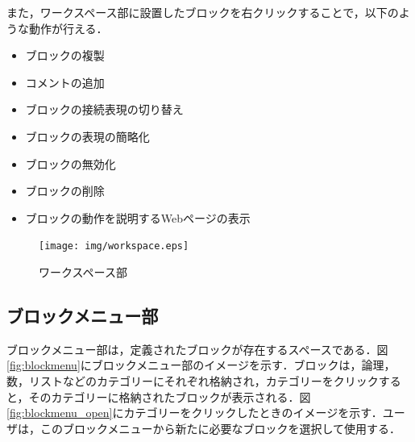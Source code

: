 \documentclass{risepaper}
\begin{document}
また，ワークスペース部に設置したブロックを右クリックすることで，以下のような動作が行える．

\begin{itemize}
\item ブロックの複製
\item コメントの追加
\item ブロックの接続表現の切り替え
\item ブロックの表現の簡略化
\item ブロックの無効化
\item ブロックの削除
\item ブロックの動作を説明するWebページの表示
\end{itemize} 
   
\begin{figure}[h]
\begin{center}
\texttt{[image: img/workspace.eps]}
\caption{ワークスペース部}%
\label{fig:workspace}
\end{center}%
\end{figure}%

   \subsection{ブロックメニュー部}
   
ブロックメニュー部は，定義されたブロックが存在するスペースである．図\ref{fig:blockmenu}にブロックメニュー部のイメージを示す．ブロックは，論理，数，リストなどのカテゴリーにそれぞれ格納され，カテゴリーをクリックすると，そのカテゴリーに格納されたブロックが表示される．図\ref{fig:blockmenu_open}にカテゴリーをクリックしたときのイメージを示す．ユーザは，このブロックメニューから新たに必要なブロックを選択して使用する．
\end{document}

